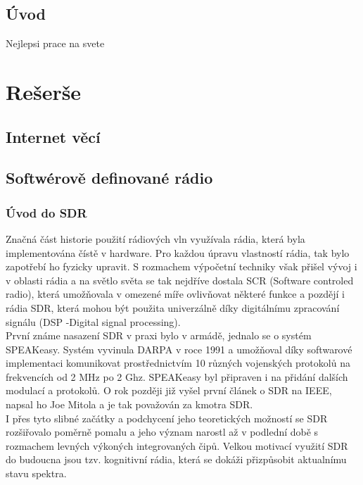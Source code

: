 \documentclass{ctuthesis}
\begin{document}
\maketitle

\chapter{Úvod}
Nejlepsi prace na svete

\part{Rešerše}
\chapter{Internet věcí}



\chapter{Softwérově definované rádio} \label{chapter:sdr}
\section{Úvod do SDR} 
Značná část historie použití rádiových vln využívala rádia, která byla implementována čístě v hardware. Pro každou úpravu  vlastností rádia, tak bylo zapotřebí ho fyzicky upravit. S rozmachem výpočetní techniky však přišel vývoj i v oblasti rádia a na světlo světa se tak nejdříve dostala SCR (Software controled radio), která umožňovala v omezené míře ovlivňovat některé funkce a pozdějí i rádia SDR, která mohou být použita univerzálně díky digitálnímu zpracování signálu (DSP -Digital signal processing). \\
První známe nasazení SDR v praxi bylo v armádě, jednalo se o systém SPEAKeasy. Systém vyvinula DARPA v roce 1991 a umožňoval díky softwarové implementaci komunikovat prostřednictvím 10 různých vojenských protokolů na frekvencích od 2 MHz po 2 Ghz. SPEAKeasy byl připraven i na přidání dalších modulací a protokolů. O rok později již vyšel první článek o SDR na IEEE, napsal ho Joe Mitola a je tak považován za kmotra SDR. \cite{sdrHistory2010}\\
I přes tyto slibné začátky a podchycení jeho teoretických možností se SDR rozšiřovalo poměrně pomalu a jeho význam narostl až v podlední době s rozmachem levných výkoných integrovaných čipů. Velkou motivací využití SDR do budoucna jsou tzv. kognitivní rádia, která se dokáži přizpůsobit aktualnímu stavu spektra.
\end{document}
